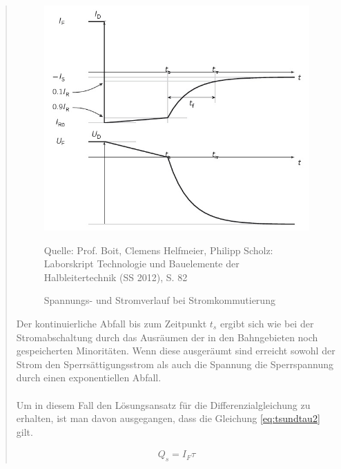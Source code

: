 \begin{quote}
    \begin{figure}[H]
        \centering
        \includegraphics[scale=0.7]{./SchaltverhaltenBilder/Stromkommutierung.jpg}
        \caption{Spannungs- und Stromverlauf bei Stromkommutierung}
             \begin{center}
                 \small Quelle: Prof. Boit, Clemens Helfmeier, Philipp Scholz: Laborskript Technologie und Bauelemente der Halbleitertechnik (SS 2012), S. 82
             \end{center}
        \label{fig:kommverlauf}
    \end{figure}

    \vspace{2em}

    Der kontinuierliche Abfall bis zum Zeitpunkt $t_s$ ergibt sich wie bei der
    Stromabschaltung durch das Ausräumen der in den Bahngebieten noch
    gespeicherten Minoritäten. Wenn diese ausgeräumt sind erreicht sowohl der
    Strom den Sperrsättigungsstrom als auch die Spannung die Sperrspannung durch
    einen exponentiellen Abfall.\\
    \\
    Um in diesem Fall den Lösungsansatz für die Differenzialgleichung zu
    erhalten, ist man davon ausgegangen, dass die Gleichung \ref{eq:tsundtau2}
    gilt.

    \begin{equation}
         \begin{split}
             Q_{s}=I_{F}\tau
             \end{split}
         \label{eq:tsundtau2}
    \end{equation}


\end{quote}
